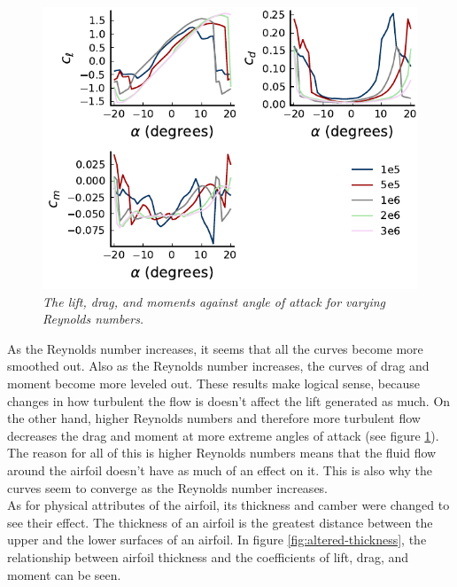 \documentclass{journal}
\begin{document}
	\begin{figure}[H]
		\centering
		\includegraphics{../graphics/altered-reynolds.pdf}
		\caption{\emph{The lift, drag, and moments against angle of attack for varying Reynolds numbers.}}
		\label{fig:altered-reynolds}
	\end{figure}
	
	As the Reynolds number increases, it seems that all the curves become more smoothed out. Also as the Reynolds number increases, the curves of drag and moment become more leveled out. These results make logical sense, because changes in how turbulent the flow is doesn't affect the lift generated as much. On the other hand, higher Reynolds numbers and therefore more turbulent flow decreases the drag and moment at more extreme angles of attack (see figure \ref{fig:altered-reynolds}). The reason for all of this is higher Reynolds numbers means that the fluid flow around the airfoil doesn't have as much of an effect on it. This is also why the curves seem to converge as the Reynolds number increases.\\
	
	As for physical attributes of the airfoil, its thickness and camber were changed to see their effect. The thickness of an airfoil is the greatest distance between the upper and the lower surfaces of an airfoil. In figure \ref{fig:altered-thickness}, the relationship between airfoil thickness and the coefficients of lift, drag, and moment can be seen.\\
	
\end{document}
